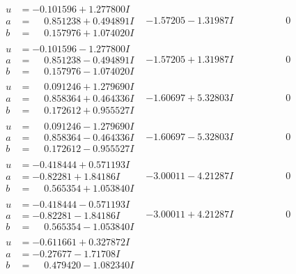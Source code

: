 \documentclass[1p]{elsarticle_modified}
\theoremstyle{definition}
\begin{document}
$$\begin{array}{c|c|c}
\begin{aligned}
u &= -0.101596 + 1.277800 I \\
a &= \phantom{-}0.851238 + 0.494891 I \\
b &= \phantom{-}0.157976 + 1.074020 I\end{aligned}
 & -1.57205 - 1.31987 I & \phantom{-0.000000 } 0 \\ \hline\begin{aligned}
u &= -0.101596 - 1.277800 I \\
a &= \phantom{-}0.851238 - 0.494891 I \\
b &= \phantom{-}0.157976 - 1.074020 I\end{aligned}
 & -1.57205 + 1.31987 I & \phantom{-0.000000 } 0 \\ \hline\begin{aligned}
u &= \phantom{-}0.091246 + 1.279690 I \\
a &= \phantom{-}0.858364 + 0.464336 I \\
b &= \phantom{-}0.172612 + 0.955527 I\end{aligned}
 & -1.60697 + 5.32803 I & \phantom{-0.000000 } 0 \\ \hline\begin{aligned}
u &= \phantom{-}0.091246 - 1.279690 I \\
a &= \phantom{-}0.858364 - 0.464336 I \\
b &= \phantom{-}0.172612 - 0.955527 I\end{aligned}
 & -1.60697 - 5.32803 I & \phantom{-0.000000 } 0 \\ \hline\begin{aligned}
u &= -0.418444 + 0.571193 I \\
a &= -0.82281 + 1.84186 I \\
b &= \phantom{-}0.565354 + 1.053840 I\end{aligned}
 & -3.00011 - 4.21287 I & \phantom{-0.000000 } 0 \\ \hline\begin{aligned}
u &= -0.418444 - 0.571193 I \\
a &= -0.82281 - 1.84186 I \\
b &= \phantom{-}0.565354 - 1.053840 I\end{aligned}
 & -3.00011 + 4.21287 I & \phantom{-0.000000 } 0 \\ \hline\begin{aligned}
u &= -0.611661 + 0.327872 I \\
a &= -0.27677 - 1.71708 I \\
b &= \phantom{-}0.479420 - 1.082340 I\end{aligned}

\end{array}$$
\end{document}
